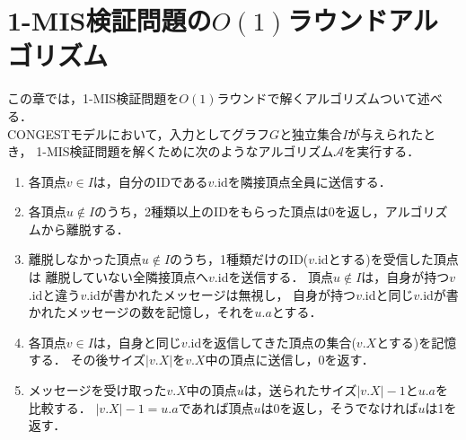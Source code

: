 \documentclass[12pt]{thesis}
\newcommand{\CONGEST}{\textsf{CONGEST}}
\theoremstyle{definition}
\begin{document}
\chapter{1-MIS検証問題の$O(1)$ラウンドアルゴリズム}
この章では，1-MIS検証問題を$O(1)$ラウンドで解くアルゴリズムついて述べる． \\
{\CONGEST}モデルにおいて，入力としてグラフ$G$と独立集合$I$が与えられたとき，
1-MIS検証問題を解くために次のようなアルゴリズム$\mathcal{A}$を実行する．
\begin{enumerate}
\item 各頂点$v \in I$は，自分のIDである$v$.idを隣接頂点全員に送信する．
\item 各頂点$u \notin I$のうち，2種類以上のIDをもらった頂点は0を返し，アルゴリズムから離脱する．
\item 離脱しなかった頂点$u \notin I$のうち，1種類だけのID($v$.idとする)を受信した頂点は
離脱していない全隣接頂点へ$v$.idを送信する．
頂点$u \notin I$は，自身が持つ$v$.idと違う$v$.idが書かれたメッセージは無視し，
自身が持つ$v$.idと同じ$v$.idが書かれたメッセージの数を記憶し，それを$u.a$とする．
\item 各頂点$v \in I$は，自身と同じ$v$.idを返信してきた頂点の集合($v.X$とする)を記憶する．
その後サイズ$|v.X|$を$v.X$中の頂点に送信し，0を返す．
\item メッセージを受け取った$v.X$中の頂点$u$は，送られたサイズ$|v.X| - 1$と$u.a$を比較する．
$|v.X | - 1 = u.a$であれば頂点$u$は$0$を返し，そうでなければ$u$は1を返す．
\end{enumerate}
\end{document}
